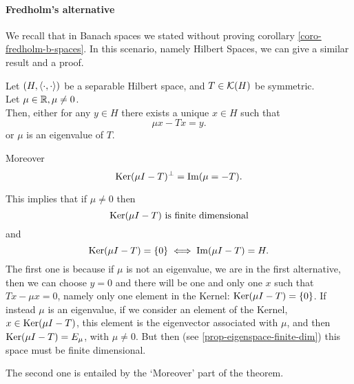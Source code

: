 \paragraph{Fredholm's alternative} We recall that in Banach spaces we stated without proving corollary \vref{coro-fredholm-b-spaces}. In this scenario, namely Hilbert Spaces, we can give a similar result and a proof.

\begin{theo}
	\label{theo-fredholm-h-spaces}
	Let $(H,\left\langle\cdot, \cdot\right\rangle )$ be a separable Hilbert space, and $T \in \mathcal K(H)$ be symmetric.\\
	Let $\mu \in \mathbb R, \mu \neq 0$.\\
	Then, either for any $y \in H$ there exists a unique $x \in H$ such that 
	$$
		\mu x - Tx 
		= y
		.
	$$
	or $\mu$ is an eigenvalue of $T$.
	
	Moreover 
	$$
		\operatorname{Ker} (\mu I - T)^\perp 
		= \operatorname{Im} (\mu = - T)
		.
	$$
\end{theo}

This implies that if $\mu \neq 0$ then
$$
	\operatorname{Ker}(\mu I - T) \ \text{is finite dimensional}
$$
and
$$
	\operatorname{Ker}(\mu I - T) =\{0\} \iff \operatorname{Im} (\mu I - T) = H.
$$
The first one is because if $\mu$ is not an eigenvalue, we are in the first alternative, then we can choose $y=0$ and there will be one and only one $x$ such that $Tx-\mu x=0$, namely only one element in the Kernel: $\operatorname{Ker}(\mu I-T)=\{0\}$. If instead $\mu$ is an eigenvalue, if we consider an element of the Kernel, $x\in \operatorname{Ker}(\mu I -T)$, this element is the eigenvector associated with $\mu$, and then $\operatorname{Ker}(\mu I-T)=E_{\mu}$, with $\mu\neq 0$. But then (see \vref{prop-eigenspace-finite-dim}) this space must be finite dimensional.

The second one is entailed by the `Moreover' part of the theorem.

